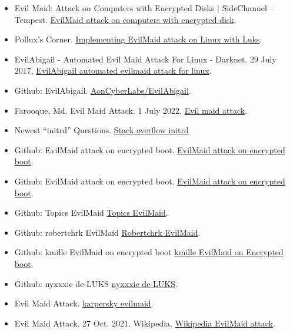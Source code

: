 \documentclass{article}
\begin{document}
\begin{itemize}
  \item Evil Maid: Attack on Computers with Encrypted Disks $\mid$ SideChannel – Tempest. \href{https://sidechannel.blog/en/evil-maid-attack-on-computers-with-encrypted-disks/}{   EvilMaid attack on computers with encrypted disk}.
  
  \item Pollux’s Corner. \href{https://www.wzdftpd.net/blog/implementing-the-evil-maid-attack-on-linux-with-luks.html}{Implementing EvilMaid attack on Linux with Luks}.
  
  \item EvilAbigail - Automated Evil Maid Attack For Linux - Darknet. 29 July 2017, \href{https://www.darknet.org.uk/2017/07/evilabigail-automated-evil-maid-attack-for-linux/}{EvilAbigail automated evilmaid attack for linux}.
  
  \item Github: EvilAbigail. \href{https://github.com/AonCyberLabs/EvilAbigail/}{AonCyberLabs/EvilAbigail}.
  
  \item Farooque, Md. Evil Maid Attack. 1 July 2022, \href{https://cinetruth.com/evil-maid-attack/}{Evil maid attack}.
  
  \item Newest “initrd” Questions. \href{https://stackoverflow.com/questions/tagged/initrd}{Stack overflow initrd}
  
  \item Github: EvilMaid attack on encrypted boot. \href{https://github.com/kmille/evil-maid-attack-on-encrypted-boot/blob/main/extract-core.py}{EvilMaid attack on encrypted boot}.
  
  \item Github: EvilMaid attack on encrypted boot. \href{https://github.com/kmille/evil-maid-attack-on-encrypted-boot/blob/main/extract-core.py}{EvilMaid attack on encrypted boot}.
  
  \item Github: Topics EvilMaid \href{https://github.com/topics/evil-maid}{Topics EvilMaid}.
  
  \item Github: robertchrk EvilMaid \href{https://github.com/robertchrk/evilmaid}{Robertchrk EvilMaid}.
  
  \item Github: kmille EvilMaid on encrypted boot \href{https://github.com/kmille/evil-maid-attack-on-encrypted-boot}{kmille EvilMaid on Encrypted boot}.
  
  \item Github: nyxxxie de-LUKS \href{https://github.com/nyxxxie/de-LUKS}{nyxxxie de-LUKS}.
  
  \item Evil Maid Attack. \href{https://encyclopedia.kaspersky.com/glossary/evil-maid/}{karpersky evilmaid}. 
  
  \item Evil Maid Attack. 27 Oct. 2021. Wikipedia, \href{https://en.wikipedia.org/w/index.php?title=Evil_maid_attack&oldid=1052101751}{Wikipedia EvilMaid attack}. 
  
\end{itemize}
\end{document}
